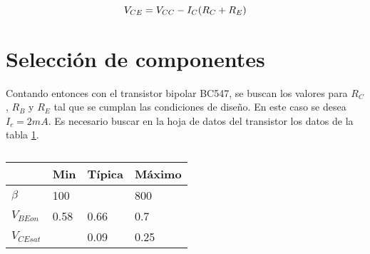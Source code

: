 \begin{equation}
    V_{CE}=V_{CC}-I_C(R_C+R_E)
    \label{eq_V_CE}
\vspace{8mm}
\end{equation}

\section{Selección de componentes}

Contando entonces con el transistor bipolar BC547, se buscan los valores para $R_C$, $R_B$ y $R_E$ tal que se cumplan las condiciones de diseño.
En este caso se desea $I_c =  2mA$. Es necesario buscar en la hoja de datos del transistor los datos de la tabla \ref{table:parametros transistor}.
\begin{table}[ht]
    \centering
    \begin{tabular}{l|l|l|l}
                  & Min  & Típica & Máximo \\ \hline
    $\beta$       & 100  &        & 800    \\ \hline
    $V_{BEon}$    & 0.58 & 0.66   & 0.7    \\ \hline
    $V_{CEsat}$   &      & 0.09   & 0.25  
    \end{tabular} 
    \caption{}\label{table:parametros transistor}
\end{table}

